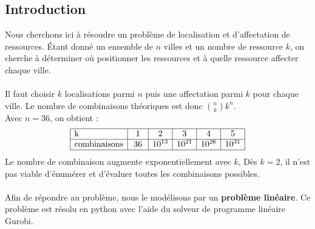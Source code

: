 \documentclass[12pt]{article}
\begin{document}
\subsection{Introduction}
Nous cherchons ici à résoudre un problème de localisation et d'affectation de ressources. Étant donné un ensemble de $n$ villes et un nombre de ressource $k$, on cherche à déterminer où positionner les ressources et à quelle ressource affecter chaque ville.
\\\\
Il faut choisir $k$ localisations parmi $n$ puis une affectation parmi $k$ pour chaque ville. Le nombre de combinaisons théoriques est donc ${n\choose k} k^n$.
\\
Avec $n=36$, on obtient :
\[\begin{array}{|l|c|c|c|c|c|}
\hline
\mbox{k}            &  1 &       2 &       3 &       4 &       5 \\
\hline
\mbox{combinaisons} & \: 36 \: & 10^{13} & 10^{21} & 10^{26} & 10^{31} \\
\hline
\end{array}\]
Le nombre de combinaison augmente exponentiellement avec $k$, Dès $k=2$, il n'est pas viable d'énumérer et d'évaluer toutes les combinaisons possibles.
\\\\
Afin de répondre au problème, nous le modélisons par un \textbf{problème linéaire}. Ce problème est résolu en python avec l'aide du solveur de programme linéaire Gurobi.
\end{document}
